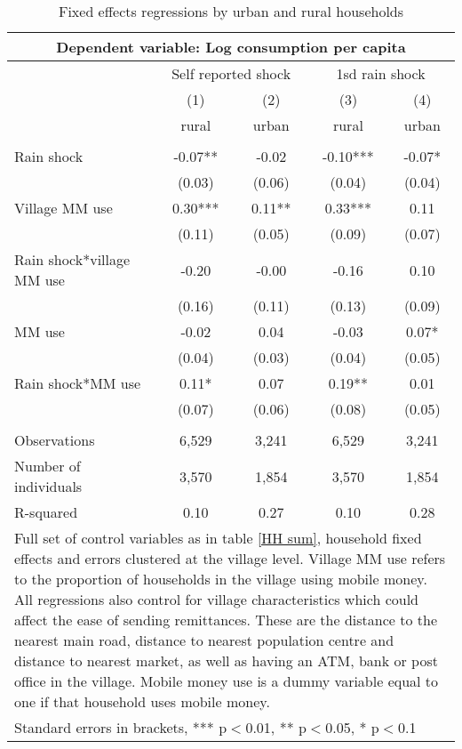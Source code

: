 \begin{table}
\centering
\caption{Fixed effects regressions by urban and rural  households} \label{urban rural}
\begin{tabular}{lcccc}
\multicolumn{5}{c}{Dependent variable: Log consumption per capita} \\ \hline
& \multicolumn{2}{c}{Self reported shock} & \multicolumn{2}{c}{1sd rain shock} \\
 & (1) & (2) & (3) & (4) \\
 & rural & urban& rural & urban  \\ \hline
 &  &  &  &  \\
Rain shock & -0.07** & -0.02 &   -0.10*** & -0.07*   \\
 & (0.03) & (0.06)  & (0.04) & (0.04)  \\
Village MM use & 0.30*** & 0.11** & 0.33*** & 0.11 \\
 & (0.11) & (0.05) & (0.09) & (0.07) \\
Rain shock*village MM use & -0.20 & -0.00 & -0.16 & 0.10  \\
 & (0.16) & (0.11) & (0.13) & (0.09)  \\
MM use & -0.02 & 0.04 & -0.03 & 0.07* \\
 & (0.04) & (0.03) & (0.04) & (0.05) \\
Rain shock*MM use & 0.11* & 0.07 & 0.19** & 0.01  \\
 & (0.07) & (0.06) & (0.08) & (0.05)  \\
 &  &  &  &  \\
Observations & 6,529 & 3,241 & 6,529 & 3,241 \\
Number of individuals & 3,570 & 1,854 & 3,570 & 1,854 \\
R-squared & 0.10 & 0.27 & 0.10 & 0.28 \\\hline
\multicolumn{5}{p{11cm}}{Full set of control variables as in table \ref{HH sum}, household fixed effects and errors clustered at the village level. Village MM use refers to the proportion of households in the village using mobile money. All regressions also control for village characteristics which could affect the ease of sending remittances. These are the distance to the nearest main road, distance to nearest population centre and distance to nearest market, as well as having an ATM, bank or post office in the village. Mobile money use is a dummy variable equal to one if that household uses mobile money.} \\
\multicolumn{5}{l}{ Standard errors in brackets, *** p$<$0.01, ** p$<$0.05, * p$<$0.1} \\
\end{tabular}
\end{table}